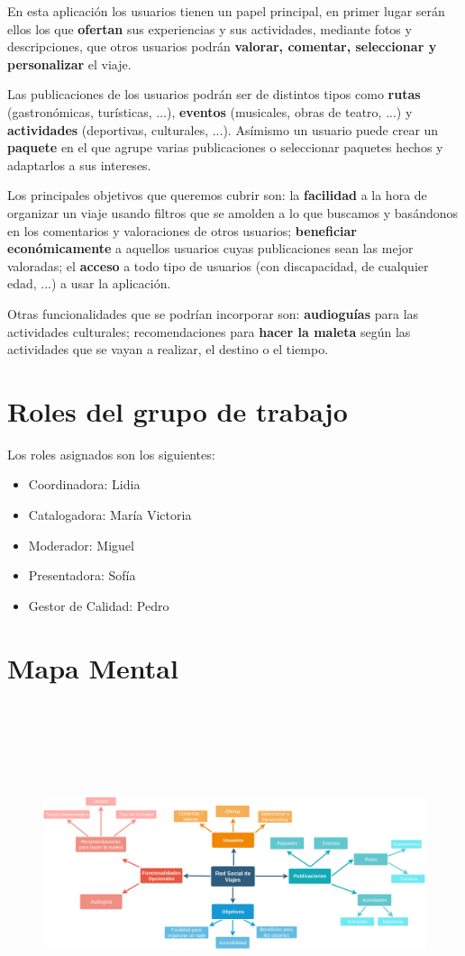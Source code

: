 \documentclass[11pt]{article}
\begin{document}
En esta aplicación los usuarios tienen un papel principal, en primer lugar serán ellos los que \textbf{ofertan} sus experiencias y sus actividades, mediante fotos y descripciones, que otros usuarios podrán \textbf{valorar, comentar, seleccionar y personalizar} el viaje.

Las publicaciones de los usuarios podrán ser de distintos tipos como \textbf{rutas} (gastronómicas, turísticas, ...), \textbf{eventos} (musicales, obras de teatro, ...) y \textbf{actividades} (deportivas, culturales, ...). Asímismo un usuario puede crear un \textbf{paquete} en el que agrupe varias publicaciones o seleccionar paquetes hechos y adaptarlos a sus intereses.

Los principales objetivos que queremos cubrir son: la \textbf{facilidad} a la hora de organizar un viaje usando filtros que se amolden a lo que buscamos y basándonos en los comentarios y valoraciones de otros usuarios; \textbf{beneficiar económicamente} a aquellos usuarios cuyas publicaciones sean las mejor valoradas; el \textbf{acceso} a todo tipo de usuarios (con discapacidad, de cualquier edad, ...) a usar la aplicación.

Otras funcionalidades que se podrían incorporar son: \textbf{audioguías} para las actividades culturales; recomendaciones para \textbf{hacer la maleta} según las actividades que se vayan a realizar, el destino o el tiempo.

\section {Roles del grupo de trabajo}
Los roles asignados son los siguientes:

\begin{itemize}
\item{Coordinadora}: Lidia
\item{Catalogadora}: María Victoria
\item{Moderador}: Miguel
\item{Presentadora}: Sofía
\item{Gestor de Calidad}: Pedro

\end{itemize}

\newpage
{}
\section {Mapa Mental}
\begin{figure}[h]
\centering
\includegraphics[width=25cm, height=10cm] {../Imagenes/MapaMentalp1}
\end{figure}
\end{document}
